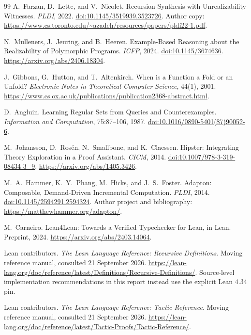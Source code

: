 \documentclass[11pt,a4paper]{article}
\theoremstyle{definition}
\theoremstyle{remark}
\begin{document}
\begin{thebibliography}{99}
A.~Farzan, D.~Lette, and V.~Nicolet.
Recursion Synthesis with Unrealizability Witnesses.
\emph{PLDI}, 2022.
\href{https://doi.org/10.1145/3519939.3523726}{doi:10.1145/3519939.3523726}.
Author copy: \url{https://www.cs.toronto.edu/~azadeh/resources/papers/pldi22-1.pdf}.

N.~Mulleners, J.~Jeuring, and B.~Heeren.
Example-Based Reasoning about the Realizability of Polymorphic Programs.
\emph{ICFP}, 2024.
\href{https://doi.org/10.1145/3674636}{doi:10.1145/3674636}.
\url{https://arxiv.org/abs/2406.18304}.

J.~Gibbons, G.~Hutton, and T.~Altenkirch.
When is a Function a Fold or an Unfold?
\emph{Electronic Notes in Theoretical Computer Science}, 44(1), 2001.
\url{https://www.cs.ox.ac.uk/publications/publication2368-abstract.html}.

D.~Angluin. Learning Regular Sets from Queries and Counterexamples.
\emph{Information and Computation}, 75:87--106, 1987.
\href{https://doi.org/10.1016/0890-5401(87)90052-6}{doi:10.1016/0890-5401(87)90052-6}.

M.~Johansson, D.~Ros\'en, N.~Smallbone, and K.~Claessen.
Hipster: Integrating Theory Exploration in a Proof Assistant.
\emph{CICM}, 2014.
\href{https://doi.org/10.1007/978-3-319-08434-3_9}{doi:10.1007/978-3-319-08434-3\_9}.
\url{https://arxiv.org/abs/1405.3426}.

M.~A.~Hammer, K.~Y.~Phang, M.~Hicks, and J.~S.~Foster.
Adapton: Composable, Demand-Driven Incremental Computation.
\emph{PLDI}, 2014.
\href{https://doi.org/10.1145/2594291.2594324}{doi:10.1145/2594291.2594324}.
Author project and bibliography: \url{https://matthewhammer.org/adapton/}.

M.~Carneiro. Lean4Lean: Towards a Verified Typechecker for Lean, in Lean.
Preprint, 2024. \url{https://arxiv.org/abs/2403.14064}.

Lean contributors. \emph{The Lean Language Reference: Recursive Definitions}.
Moving reference manual, consulted 21 September 2026.
\url{https://lean-lang.org/doc/reference/latest/Definitions/Recursive-Definitions/}.
Source-level implementation recommendations in this report instead use the
explicit Lean 4.34 pin.

Lean contributors. \emph{The Lean Language Reference: Tactic Reference}.
Moving reference manual, consulted 21 September 2026.
\url{https://lean-lang.org/doc/reference/latest/Tactic-Proofs/Tactic-Reference/}.


\end{thebibliography}
\end{document}
